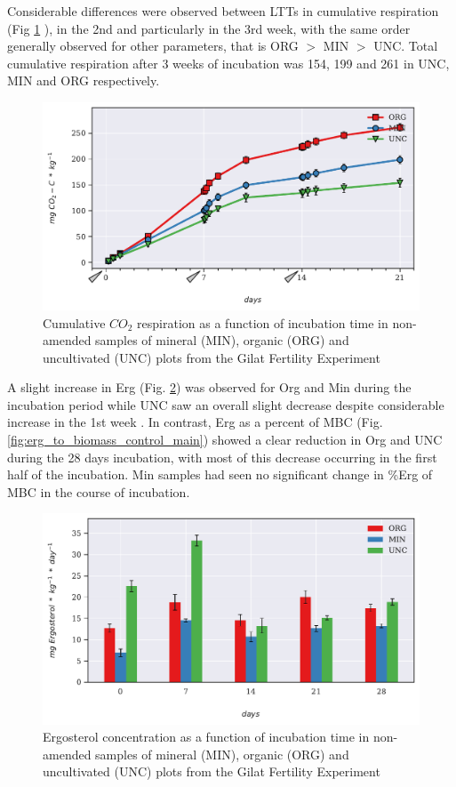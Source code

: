 			\noindent Considerable differences were observed between LTTs in cumulative respiration (Fig \ref{fig:cumulative_control_main} ), in the 2nd and particularly in the 3rd week, with the same order generally observed for other parameters, that is ORG $ > $ MIN $ > $ UNC. Total cumulative respiration after 3 weeks of incubation was 154, 199 and 261 in UNC, MIN and ORG respectively.
				\begin{figure}[H]
				\centering
				\includegraphics[scale=0.8, width=\linewidth]{thesis_figures/main_incubation/control/Cum_Resp.pdf}
				\caption{Cumulative $CO_2$ respiration  as a function of incubation time in non-amended samples of mineral (MIN), organic (ORG) and uncultivated (UNC) plots from the Gilat Fertility Experiment}
				\label{fig:cumulative_control_main}
				\end{figure}
			\noindent A slight increase in Erg (Fig. \ref{fig:erg_control_main}) was observed for Org and Min during the incubation period while UNC saw an overall slight decrease despite considerable increase in the 1st week . In contrast, Erg as a percent of MBC (Fig. \ref{fig:erg_to_biomass_control_main}) showed a clear reduction in Org and UNC during the 28 days incubation, with most of this decrease occurring in the first half of the incubation. Min samples had seen no significant change in \%Erg of MBC in the course of incubation.
			\begin{figure}[H]
				\centering
				\includegraphics[scale=0.8, width=\linewidth]{thesis_figures/main_incubation/control/Erg.pdf}
				\caption{Ergosterol concentration  as a function of incubation time in non-amended samples of mineral (MIN), organic (ORG) and uncultivated (UNC) plots from the Gilat Fertility Experiment}
				\label{fig:erg_control_main}
			\end{figure}


